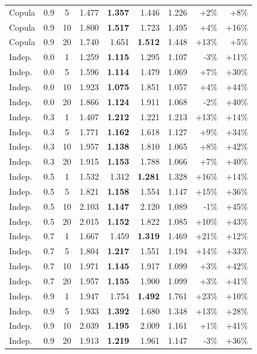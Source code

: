 \begin{table}[t]
\begin{tabular}{lcc | rrrr | rr}
    Copula & 0.9 & 5 & 1.477 & \textbf{1.357} & 1.446 & 1.226 & +2\% & +8\% \\
    Copula & 0.9 & 10 & 1.800 & \textbf{1.517} & 1.723 & 1.495 & +4\% & +16\% \\
    Copula & 0.9 & 20 & 1.740 & 1.651 & \textbf{1.512} & 1.448 & +13\% & +5\% \\
    Indep. & 0.0 & 1 & 1.259 & \textbf{1.115} & 1.295 & 1.107 & -3\% & +11\% \\
    Indep. & 0.0 & 5 & 1.596 & \textbf{1.114} & 1.479 & 1.069 & +7\% & +30\% \\
    Indep. & 0.0 & 10 & 1.923 & \textbf{1.075} & 1.851 & 1.057 & +4\% & +44\% \\
    Indep. & 0.0 & 20 & 1.866 & \textbf{1.124} & 1.911 & 1.068 & -2\% & +40\% \\
    Indep. & 0.3 & 1 & 1.407 & \textbf{1.212} & 1.221 & 1.213 & +13\% & +14\% \\
    Indep. & 0.3 & 5 & 1.771 & \textbf{1.162} & 1.618 & 1.127 & +9\% & +34\% \\
    Indep. & 0.3 & 10 & 1.957 & \textbf{1.138} & 1.810 & 1.065 & +8\% & +42\% \\
    Indep. & 0.3 & 20 & 1.915 & \textbf{1.153} & 1.788 & 1.066 & +7\% & +40\% \\
    Indep. & 0.5 & 1 & 1.532 & 1.312 & \textbf{1.281} & 1.328 & +16\% & +14\% \\
    Indep. & 0.5 & 5 & 1.821 & \textbf{1.158} & 1.554 & 1.147 & +15\% & +36\% \\
    Indep. & 0.5 & 10 & 2.103 & \textbf{1.147} & 2.120 & 1.089 & -1\% & +45\% \\
    Indep. & 0.5 & 20 & 2.015 & \textbf{1.152} & 1.822 & 1.085 & +10\% & +43\% \\
    Indep. & 0.7 & 1 & 1.667 & 1.459 & \textbf{1.319} & 1.469 & +21\% & +12\% \\
    Indep. & 0.7 & 5 & 1.804 & \textbf{1.217} & 1.551 & 1.194 & +14\% & +33\% \\
    Indep. & 0.7 & 10 & 1.971 & \textbf{1.145} & 1.917 & 1.099 & +3\% & +42\% \\
    Indep. & 0.7 & 20 & 1.957 & \textbf{1.155} & 1.900 & 1.099 & +3\% & +41\% \\
    Indep. & 0.9 & 1 & 1.947 & 1.754 & \textbf{1.492} & 1.761 & +23\% & +10\% \\
    Indep. & 0.9 & 5 & 1.933 & \textbf{1.392} & 1.680 & 1.348 & +13\% & +28\% \\
    Indep. & 0.9 & 10 & 2.039 & \textbf{1.195} & 2.009 & 1.161 & +1\% & +41\% \\
    Indep. & 0.9 & 20 & 1.913 & \textbf{1.219} & 1.961 & 1.147 & -3\% & +36\% \\
    \bottomrule
  \end{tabular}
\end{table}

